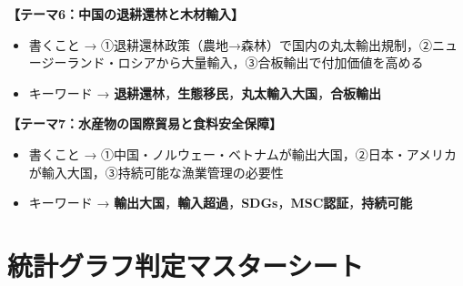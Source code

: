 \documentclass[a4paper,11pt]{article}
\newcommand{\key}[1]{\textbf{\textcolor{mainblue}{#1}}}
\begin{document}
\begin{tcolorbox}[warnbox, title={■ 記述テーマ別ポイント一覧}]
\medskip
\textbf{【テーマ6：中国の退耕還林と木材輸入】}
\begin{itemize}[leftmargin=1.5em]
  \item 書くこと → ①退耕還林政策（農地→森林）で国内の丸太輸出規制，②ニュージーランド・ロシアから大量輸入，③合板輸出で付加価値を高める
  \item キーワード → \key{退耕還林}，\key{生態移民}，\key{丸太輸入大国}，\key{合板輸出}
\end{itemize}

\medskip
\textbf{【テーマ7：水産物の国際貿易と食料安全保障】}
\begin{itemize}[leftmargin=1.5em]
  \item 書くこと → ①中国・ノルウェー・ベトナムが輸出大国，②日本・アメリカが輸入大国，③持続可能な漁業管理の必要性
  \item キーワード → \key{輸出大国}，\key{輸入超過}，\key{SDGs}，\key{MSC認証}，\key{持続可能}
\end{itemize}
\end{tcolorbox}

\vspace{2mm}

\section{統計グラフ判定マスターシート}
\end{document}
